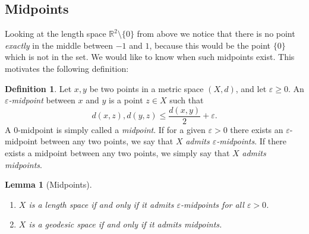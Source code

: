 \documentclass[11pt, a4paper, oneside]{memoir}
\theoremstyle{plain}\newtheorem{theorem}[subsection]{Theorem}
\newtheorem{lemma}[subsection]{Lemma}
\theoremstyle{definition}
\newtheorem{definition}[subsection]{Definition}
\newcommand{\parenum}{\setenumerate[1]{label=\textbf{(\arabic*)}}}
\newcommand{\R}{\mathbb{R}}
\begin{document}
\subsection{Midpoints}
Looking at the length space \(\R^2\setminus\{0\}\) from above we notice that there is no point \emph{exactly} in the middle between \(-1\) and \(1\), because this would be the point \(\{0\}\) which is not in the set.
We would like to know when such midpoints exist.
This motivates the following definition:

\begin{definition}
Let \(x,y\) be two points in a metric space \((X,d)\), and let \(\varepsilon\geq 0\).
An \textit{\(\varepsilon\)-midpoint} between \(x\) and \(y\) is a point \(z\in X\) such that 
\[d(x,z),d(y,z)\leq \frac{d(x,y)}{2}+\varepsilon.\]
A 0-midpoint is simply called a \textit{midpoint}.
If for a given \(\varepsilon>0\) there exists an \(\varepsilon\)-midpoint between any two points, we say that \(X\) \textit{admits \(\varepsilon\)-midpoints}.
If there exists a midpoint between any two points, we simply say that \(X\) \textit{admits midpoints}.
\end{definition} %
\begin{lemma}[Midpoints]\label{lem:midpoints}
\parenum
\begin{enumerate}
    \item \(X\) is a length space if and only if it admits \(\varepsilon\)-midpoints for all \(\varepsilon>0\).
    \item \(X\) is a geodesic space if and only if it admits midpoints.
\end{enumerate}
\end{lemma} %
\end{document}
